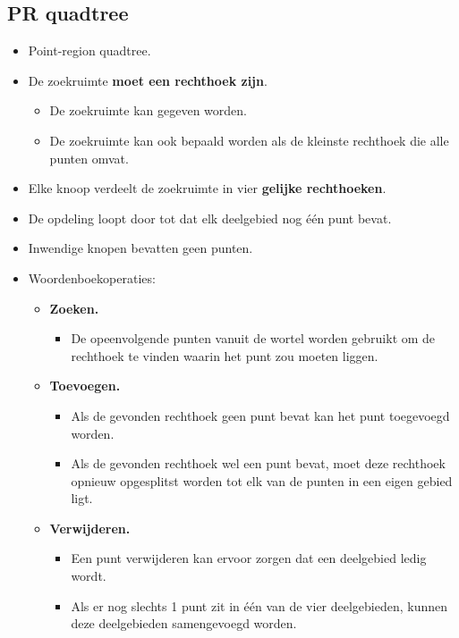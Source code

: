 \subsection{PR quadtree}
\begin{itemize}
    \item Point-region quadtree.
    \item De zoekruimte \textbf{moet een rechthoek zijn}.
    \begin{itemize}
        \item De zoekruimte kan gegeven worden.
        \item De zoekruimte kan ook bepaald worden als de kleinste rechthoek die alle punten omvat.
    \end{itemize}
    \item Elke knoop verdeelt de zoekruimte in vier \textbf{gelijke rechthoeken}.
    \item De opdeling loopt door tot dat elk deelgebied nog één punt bevat.
    \item Inwendige knopen bevatten geen punten.
    \item Woordenboekoperaties:
    \begin{itemize}
        \item \textbf{Zoeken.}
        \begin{itemize}
            \item De opeenvolgende punten vanuit de wortel worden gebruikt om de rechthoek te vinden waarin het punt zou moeten liggen.
        \end{itemize}
        \item \textbf{Toevoegen.}
        \begin{itemize}
            \item Als de gevonden rechthoek geen punt bevat kan het punt toegevoegd worden.
            \item Als de gevonden rechthoek wel een punt bevat, moet deze rechthoek opnieuw opgesplitst worden tot elk van de punten in een eigen gebied ligt.
        \end{itemize}
        \item \textbf{Verwijderen.}
        \begin{itemize}
            \item Een punt verwijderen kan ervoor zorgen dat een deelgebied ledig wordt.
            \item Als er nog slechts 1 punt zit in één van de vier deelgebieden, kunnen deze deelgebieden samengevoegd worden.
        \end{itemize}

\end{itemize}
\end{itemize}
